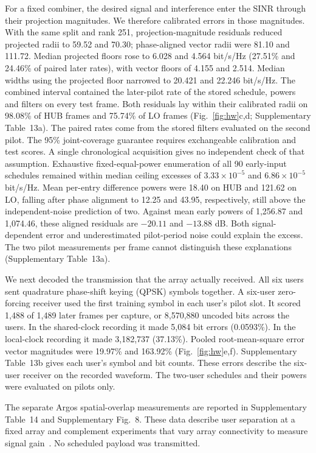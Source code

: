 \documentclass[lineno,pdflatex,sn-nature]{sn-jnl}
\begin{document}
For a fixed combiner, the desired signal and interference enter the SINR through their projection magnitudes. We therefore calibrated errors in those magnitudes. With the same split and rank 251, projection-magnitude residuals reduced projected radii to 59.52 and 70.30; phase-aligned vector radii were 81.10 and 111.72. Median projected floors rose to 6.028 and 4.564 bit/s/Hz (27.51\% and 24.46\% of paired later rates), with vector floors of 4.155 and 2.514. Median widths using the projected floor narrowed to 20.421 and 22.246 bit/s/Hz. The combined interval contained the later-pilot rate of the stored schedule, powers and filters on every test frame. Both residuals lay within their calibrated radii on 98.08\% of HUB frames and 75.74\% of LO frames (Fig.~\ref{fig:hw}c,d; Supplementary Table~13a). The paired rates come from the stored filters evaluated on the second pilot. The 95\% joint-coverage guarantee requires exchangeable calibration and test scores. A single chronological acquisition gives no independent check of that assumption. Exhaustive fixed-equal-power enumeration of all 90 early-input schedules remained within median ceiling excesses of \(3.33\times10^{-5}\) and \(6.86\times10^{-5}\) bit/s/Hz. Mean per-entry difference powers were 18.40 on HUB and 121.62 on LO, falling after phase alignment to 12.25 and 43.95, respectively, still above the independent-noise prediction of two. Against mean early powers of 1,256.87 and 1,074.46, these aligned residuals are \(-20.11\) and \(-13.88\) dB. Both signal-dependent error and underestimated pilot-period noise could explain the excess. The two pilot measurements per frame cannot distinguish these explanations (Supplementary Table~13a).


We next decoded the transmission that the array actually received. All six users sent quadrature phase-shift keying (QPSK) symbols together. A six-user zero-forcing receiver used the first training symbol in each user's pilot slot. It scored 1,488 of 1,489 later frames per capture, or 8,570,880 uncoded bits across the users. In the shared-clock recording it made 5,084 bit errors (0.0593\%). In the local-clock recording it made 3,182,737 (37.13\%). Pooled root-mean-square error vector magnitudes were 19.97\% and 163.92\% (Fig.~\ref{fig:hw}e,f). Supplementary Table~13b gives each user's symbol and bit counts. These errors describe the six-user receiver on the recorded waveform. The two-user schedules and their powers were evaluated on pilots only.

The separate Argos spatial-overlap measurements are reported in Supplementary Table~14 and Supplementary Fig.~8. These data describe user separation at a fixed array and complement experiments that vary array connectivity to measure signal gain~\cite{ni2026}. No scheduled payload was transmitted.
\end{document}
